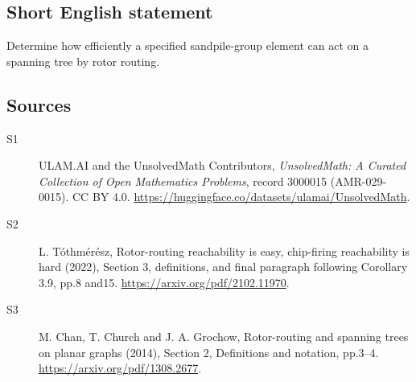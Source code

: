 \documentclass[11pt]{article}
\begin{document}
\subsection{Short English statement}
Determine how efficiently a specified sandpile-group element can act on a spanning tree by rotor routing.
\subsection{Sources}
\begin{description}
\item[\hypertarget{source:3000015:1}{S1}] ULAM.AI and the UnsolvedMath Contributors, \emph{UnsolvedMath: A Curated Collection of Open Mathematics Problems}, record 3000015 (AMR-029-0015). CC BY 4.0. \url{https://huggingface.co/datasets/ulamai/UnsolvedMath}.
\item[\hypertarget{source:3000015:2}{S2}] L. Tóthmérész, Rotor-routing reachability is easy, chip-firing reachability is hard (2022), Section 3, definitions, and final paragraph following Corollary 3.9, pp.8 and15. \url{https://arxiv.org/pdf/2102.11970}.
\item[\hypertarget{source:3000015:3}{S3}] M. Chan, T. Church and J. A. Grochow, Rotor-routing and spanning trees on planar graphs (2014), Section 2, Definitions and notation, pp.3--4. \url{https://arxiv.org/pdf/1308.2677}.
\end{description}
\label{end:3000015}
\end{document}
